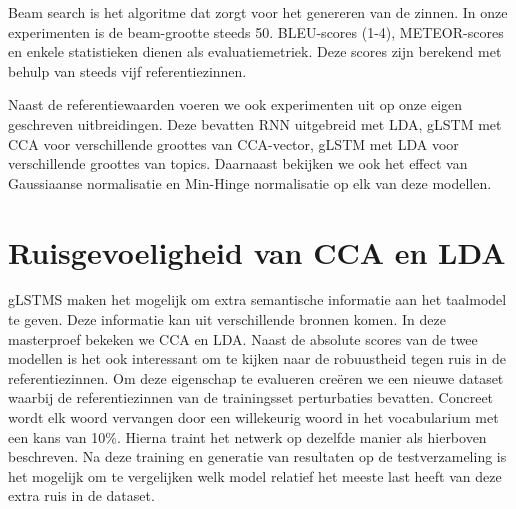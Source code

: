Beam search is het algoritme dat zorgt voor het genereren van de zinnen. In onze experimenten is de beam-grootte steeds 50.
BLEU-scores (1-4), METEOR-scores en enkele statistieken dienen als evaluatiemetriek. Deze scores zijn berekend met behulp van steeds vijf referentiezinnen.

Naast de referentiewaarden voeren we ook experimenten uit op onze eigen geschreven uitbreidingen.
Deze bevatten RNN uitgebreid met LDA, gLSTM met CCA voor verschillende groottes van CCA-vector, gLSTM met LDA voor verschillende groottes van topics. Daarnaast bekijken we ook het effect van Gaussiaanse normalisatie en Min-Hinge normalisatie op elk van deze modellen.

\section{Ruisgevoeligheid van CCA en LDA} %
\label{sec:ruisgevoeligheid_van_cca_en_lda_exp}
gLSTMS maken het mogelijk om extra semantische informatie aan het taalmodel te geven. Deze informatie kan uit verschillende bronnen komen. In deze masterproef bekeken we CCA en LDA. Naast de absolute scores van de twee modellen is het ook interessant om te kijken naar de robuustheid tegen ruis in de referentiezinnen.
Om deze eigenschap te evalueren cre\"eren we een nieuwe dataset waarbij de referentiezinnen van de trainingsset perturbaties bevatten.
Concreet wordt elk woord vervangen door een willekeurig woord in het vocabularium met een kans van 10\%. Hierna traint het netwerk op dezelfde manier als hierboven beschreven. Na deze training en generatie van resultaten op de testverzameling is het mogelijk om te vergelijken welk model relatief het meeste last heeft van deze extra ruis in de dataset.


